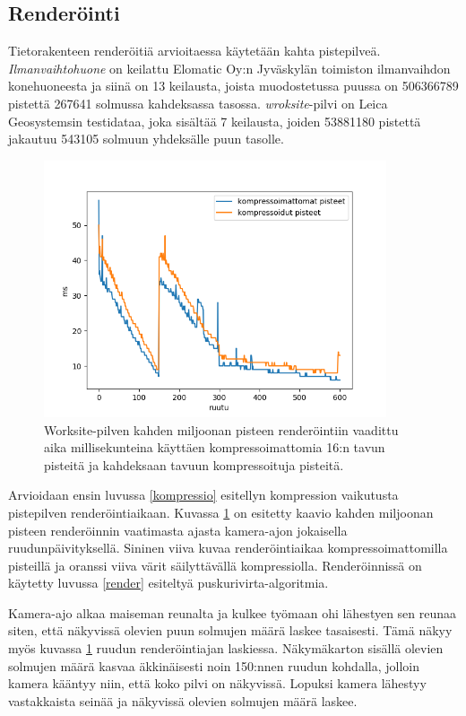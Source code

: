 \subsection{Renderöinti}\label{renderöinti}

Tietorakenteen renderöitiä arvioitaessa käytetään kahta pistepilveä. \emph{Ilmanvaihtohuone} on keilattu Elomatic Oy:n Jyväskylän toimiston ilmanvaihdon konehuoneesta ja siinä on 13 keilausta, joista muodostetussa puussa on 506366789 pistettä 267641 solmussa kahdeksassa tasossa. \emph{wroksite}-pilvi on Leica Geosystemsin testidataa, joka sisältää 7 keilausta, joiden 53881180 pistettä jakautuu 543105 solmuun yhdeksälle puun tasolle. 

\begin{figure}[h]
    \centering
    \includegraphics[width=0.9\textwidth]{tuloksia/worksite_compressed_vs_uncompressed.png}
    \caption{Worksite-pilven kahden miljoonan pisteen renderöintiin vaadittu aika millisekunteina käyttäen kompressoimattomia 16:n tavun pisteitä ja kahdeksaan tavuun kompressoituja pisteitä.}
    \label{ws_compr}
\end{figure}

Arvioidaan ensin luvussa \ref{kompressio} esitellyn kompression vaikutusta pistepilven renderöintiaikaan. Kuvassa \ref{ws_compr} on esitetty kaavio kahden miljoonan pisteen renderöinnin vaatimasta ajasta kamera-ajon jokaisella ruudunpäivityksellä. Sininen viiva kuvaa renderöintiaikaa kompressoimattomilla pisteillä ja oranssi viiva värit säilyttävällä kompressiolla. Renderöinnissä on käytetty luvussa \ref{render} esiteltyä puskurivirta-algoritmia. 

Kamera-ajo alkaa maiseman reunalta ja kulkee työmaan ohi lähestyen sen reunaa siten, että näkyvissä olevien puun solmujen määrä laskee tasaisesti. Tämä näkyy myös kuvassa \ref{ws_compr} ruudun renderöintiajan laskiessa. Näkymäkarton sisällä olevien solmujen määrä kasvaa äkkinäisesti noin 150:nnen ruudun kohdalla, jolloin kamera kääntyy niin, että koko pilvi on näkyvissä. Lopuksi kamera lähestyy vastakkaista seinää ja näkyvissä olevien solmujen määrä laskee. 

